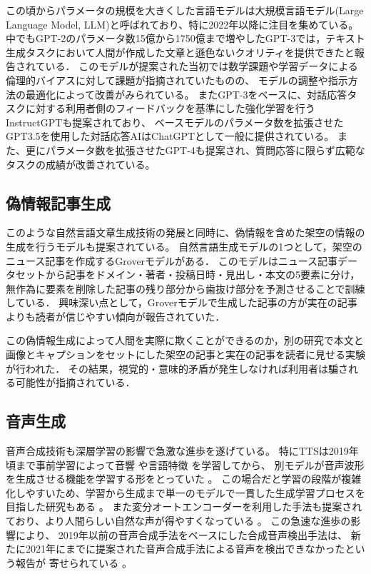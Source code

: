 この頃からパラメータの規模を大きくした言語モデルは大規模言語モデル(Large Language Model, LLM)と呼ばれており、特に2022年以降に注目を集めている。 %
中でもGPT-2のパラメータ数15億から1750億まで増やしたGPT-3では，テキスト生成タスクにおいて人間が作成した文章と遜色ないクオリティを提供できたと報告されている\cite{brown2020language}．
このモデルが提案された当初では数学課題や学習データによる倫理的バイアスに対して課題が指摘されていた\cite{Floridi2020,Chan2023}ものの、
モデルの調整\cite{borchers-etal-2022-looking}や指示方法の最適化\cite{NEURIPS2022_8bb0d291,NEURIPS2022_9d560961}によって改善がみられている\cite{DBLP:conf/aied/AnLG23}。
またGPT-3をベースに、対話応答タスクに対する利用者側のフィードバックを基準にした強化学習を行うInstructGPTも提案されており\cite{NEURIPS2022_b1efde53}、
ベースモデルのパラメータ数を拡張させたGPT3.5を使用した対話応答AIはChatGPTとして一般に提供されている\cite{RAY2023121}。
また、更にパラメータ数を拡張させたGPT-4も提案され、質問応答に限らず広範なタスクの成績が改善されている\cite{openai2023gpt4}。

\subsection{偽情報記事生成}
\label{sec:generate}
このような自然言語文章生成技術の発展と同時に、偽情報を含めた架空の情報の生成を行うモデルも提案されている。
自然言語生成モデルの1つとして，架空のニュース記事を作成するGroverモデルがある\cite{DBLP:journals/corr/abs-1905-12616}．
このモデルはニュース記事データセットから記事をドメイン・著者・投稿日時・見出し・本文の5要素に分け，無作為に要素を削除した記事の残り部分から歯抜け部分を予測させることで訓練している．
興味深い点として，Groverモデルで生成した記事の方が実在の記事よりも読者が信じやすい傾向が報告されていた．

この偽情報生成によって人間を実際に欺くことができるのか，別の研究で本文と画像とキャプションをセットにした架空の記事と実在の記事を読者に見せる実験が行われた．
その結果，視覚的・意味的矛盾が発生しなければ利用者は騙される可能性が指摘されている\cite{tan-etal-2020-detecting}．

\subsection{音声生成}
音声合成技術も深層学習の影響で急激な進歩を遂げている。
特にTTSは2019年頃まで事前学習によって音響 \cite{6639215,8461368}や言語特徴 \cite{vandenoord16_ssw}を学習してから、
別モデルが音声波形を生成させる機能を学習する形をとっていた \cite{vandenoord16_ssw,pmlr-v80-kalchbrenner18a}。
この場合だと学習の段階が複雑化しやすいため、学習から生成まで単一のモデルで一貫した生成学習プロセスを目指した研究もある \cite{wang17n_interspeech,ren2021fastspeech,donahue2021endtoend}。
また変分オートエンコーダーを利用した手法も提案されており、より人間らしい自然な声が得やすくなっている \cite{pmlr-v139-kim21f,https://doi.org/10.48550/arxiv.2205.04421}。
この急速な進歩の影響により、
2019年以前の音声合成手法をベースにした合成音声検出手法は、
新たに2021年にまでに提案された音声合成手法による音声を検出できなかったという報告が
寄せられている \cite{yamagishi21_asvspoof,yu_icmece}。

